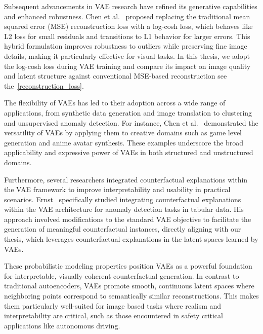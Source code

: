 Subsequent advancements in VAE research have refined its generative capabilities and enhanced robustness. Chen et al.~\cite{chen2019log} proposed replacing the traditional mean squared error (MSE) reconstruction loss with a log-cosh loss, which behaves like L2 loss for small residuals and transitions to L1 behavior for larger errors. This hybrid formulation improves robustness to outliers while preserving fine image details, making it particularly effective for visual tasks. In this thesis, we adopt the log-cosh loss during VAE training and compare its impact on image quality and latent structure against conventional MSE-based reconstruction see the~\cref{reconstruction_loss}.

The flexibility of VAEs has led to their adoption across a wide range of applications, from synthetic data generation and image translation to clustering and unsupervised anomaly detection. For instance, Chen et al.~\cite{chen2019log} demonstrated the versatility of VAEs by applying them to creative domains such as game level generation and anime avatar synthesis. These examples underscore the broad applicability and expressive power of VAEs in both structured and unstructured domains.

Furthermore, several researchers integrated counterfactual explanations within the VAE framework to improve interpretability and usability in practical scenarios. Ernst~\cite{ernst2024counterfactual} specifically studied integrating counterfactual explanations within the VAE architecture for anomaly detection tasks in tabular data. His approach involved modifications to the standard VAE objective to facilitate the generation of meaningful counterfactual instances, directly aligning with our thesis, which leverages counterfactual explanations in the latent spaces learned by VAEs.

These probabilistic modeling properties position VAEs as a powerful foundation for interpretable, visually coherent counterfactual generation. In contrast to traditional autoencoders, VAEs promote smooth, continuous latent spaces where neighboring points correspond to semantically similar reconstructions. This makes them particularly well-suited for image based tasks where realism and interpretability are critical, such as those encountered in safety critical applications like autonomous driving.

